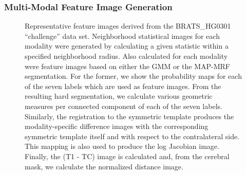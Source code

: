 \documentclass[final,5p,times,twocolumn]{elsarticle}
\begin{document}
\subsubsection{Multi-Modal Feature Image Generation}

\begin{figure}
  \centering
  \caption{Representative feature images derived from the 
           BRATS\_HG0301  ``challenge'' data set.
           Neighborhood statistical images for each modality were 
           generated by calculating a given statistic within
           a specified neighborhood radius.  Also calculated for each modality were feature
           images based on either the GMM or the MAP-MRF segmentation.  For the former, we
           show the probability maps for each of the seven labels which are used as feature
           images.  From the resulting hard segmentation, we calculate various geometric 
           measures per connected component of each of the seven labels.  Similarly, the 
           registration to the symmetric template produces the modality-specific 
           difference images with the
           corresponding symmetric template itself and with respect to the 
           contralateral side.   
           This mapping is also used to produce the log Jacobian image.  Finally, the 
           (T1 - TC) image is calculated and, from the
           cerebral mask, we calculate the normalized distance image.  
           }
  \label{fig:featureImages}         
\end{figure}
\end{document}

